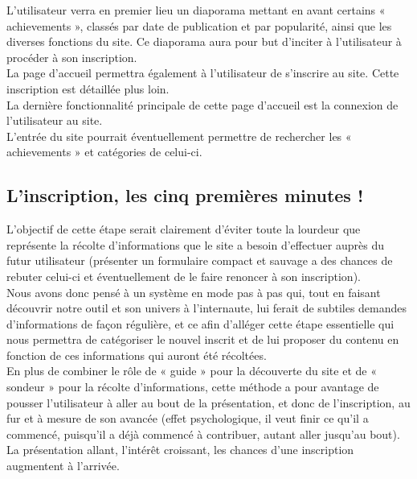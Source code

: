 \documentclass{life-fr}
\begin{document}
L'utilisateur verra en premier lieu un diaporama mettant en avant certains « achievements », classés par date de publication et par popularité, ainsi que les diverses fonctions du site. Ce diaporama aura pour but d'inciter à l'utilisateur à procéder à son inscription.\\

La page d'accueil permettra également à l'utilisateur de s'inscrire au site. Cette inscription est détaillée plus loin.\\

La dernière fonctionnalité principale de cette page d'accueil est la connexion de l'utilisateur au site.\\

L'entrée du site pourrait éventuellement permettre de rechercher les « achievements » et catégories de celui-ci.

\subsection{L'inscription, les cinq premières minutes !}

L'objectif de cette étape serait clairement d'éviter toute la lourdeur que représente la récolte d'informations que le site a besoin d'effectuer auprès du futur utilisateur (présenter un formulaire compact et sauvage a des chances de rebuter celui-ci et éventuellement de le faire renoncer à son inscription).\\

Nous avons donc pensé à un système en mode pas à pas qui, tout en faisant découvrir notre outil et son univers à l'internaute, lui ferait de subtiles demandes d'informations de façon régulière, et ce afin d'alléger cette étape essentielle qui nous permettra de catégoriser le nouvel inscrit et de lui proposer du contenu en fonction de ces informations qui auront été récoltées.\\

En plus de combiner le rôle de « guide » pour la découverte du site et de « sondeur » pour la récolte d'informations, cette méthode a pour avantage de pousser l'utilisateur à aller au bout de la présentation, et donc de l'inscription, au fur et à mesure de son avancée (effet psychologique, il veut finir ce qu'il a commencé, puisqu'il a déjà commencé à contribuer, autant aller jusqu'au bout). La présentation allant, l'intérêt croissant, les chances d'une inscription augmentent à l'arrivée.\\
\\
\end{document}
